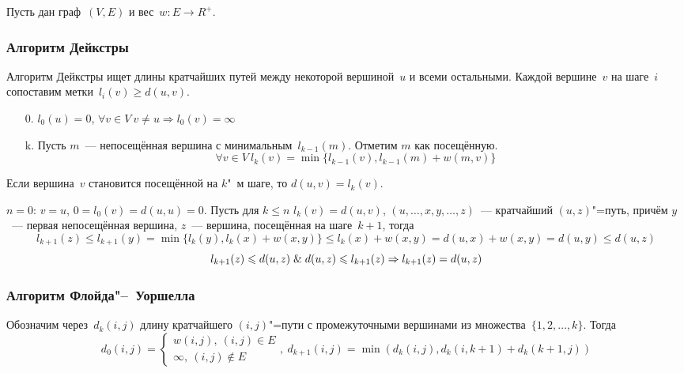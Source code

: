 Пусть дан граф~$(V, E)$ и вес~$w \colon E \to R^+$.

\subsubsection{Алгоритм Дейкстры}
 Алгоритм Дейкстры ищет длины кратчайших путей между некоторой вершиной~$u$ и всеми остальными.
Каждой вершине~$v$ на шаге~$i$ сопоставим метки~$l_i(v) \geqslant d(u, v)$.
\begin{enumerate}
	\item[0.] $l_0(u) = 0$, $\forall v \in V \ v \neq u \Rightarrow l_0(v) = \infty$
	\item[k.] Пусть $m$~--- непосещённая вершина с минимальным~$l_{k-1}(m)$.
	Отметим $m$ как посещённую.
	\begin{equation*}
	\forall v \in V \ l_k(v) = \min \{ l_{k-1}(v), l_{k-1}(m) + w(m, v) \}
	\end{equation*}
\end{enumerate}

\begin{theorem}
Если вершина~$v$ становится посещённой на $k$"~м шаге, то $d(u, v) = l_k(v)$.
\end{theorem}
\begin{proofmathind}
	\indbase $n = 0$: $v = u$, $0 = l_0(v) = d(u, u) = 0$.
	\indstep Пусть для $k \leqslant n$ $l_k(v) = d(u, v)$, $(u, \ldots, x, y, \ldots, z)$~--- кратчайший $(u, z)$"=путь, причём $y$~--- первая непосещённая вершина, $z$~--- вершина, посещённая на шаге~$k + 1$, тогда
	\begin{equation*}
	l_{k+1}(z) \leqslant l_{k+1}(y) = \min \{ l_k(y), l_k(x) + w(x, y) \} \leqslant l_k(x) + w(x, y) = d(u, x) + w(x, y) = d(u, y) \leqslant d(u, z)
	\end{equation*}
	\begin{equation*}
	l_{k+1}(z) \leqslant d(u, z) \mathrel{\&} d(u, z) \leqslant l_{k+1}(z) \Rightarrow l_{k+1}(z) = d(u, z)
	\end{equation*}
	\indend
\end{proofmathind}

\subsubsection{Алгоритм Флойда"--~Уоршелла}
 Обозначим через~$d_k(i, j)$ длину кратчайшего $(i, j)$"=пути с промежуточными вершинами из множества~$\{ 1, 2, \ldots, k \}$.
Тогда
\begin{equation*}
d_0(i, j) =
\begin{cases}
w(i, j), \ (i, j) \in E \\
\infty, \ (i, j) \notin E
\end{cases}, \
d_{k+1}(i, j) = \min(d_k(i, j), d_k(i, k + 1) + d_k(k + 1, j))
\end{equation*}